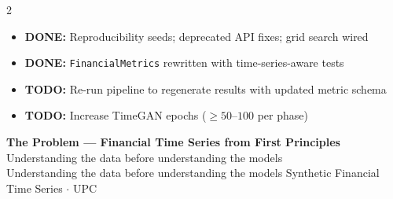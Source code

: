 \documentclass[10pt]{article}
\newcommand{\greenbox}[2]{\begin{tcolorbox}[mybox={FGreen}{GBg},title={#1}]#2\end{tcolorbox}}
\newcommand{\pagehead}[2]{%
  \begin{tcolorbox}[enhanced,arc=0pt,outer arc=0pt,boxrule=0pt,
    colback=Navy,colframe=Navy,
    top=5pt,bottom=5pt,left=8pt,right=8pt,
    before skip=0pt,after skip=10pt]
  {\color{white}\large\bfseries #1}%
  \ifx\relax#2\relax\else\\[1pt]{\color{blue!30!white}\small #2}\fi
  \hfill{\color{blue!20!white}\footnotesize Synthetic Financial Time Series $\cdot$ UPC}
  \end{tcolorbox}}
\begin{document}
\begin{multicols}{2}
\greenbox{Pipeline Status}{%
\begin{itemize}
  \item \textbf{DONE:} Reproducibility seeds; deprecated API fixes; grid search wired
  \item \textbf{DONE:} \texttt{FinancialMetrics} rewritten with time-series-aware tests
  \item \textbf{TODO:} Re-run pipeline to regenerate results with updated metric schema
  \item \textbf{TODO:} Increase TimeGAN epochs ($\geq 50$--$100$ per phase)
\end{itemize}}

\end{multicols}

\clearpage

\pagehead{The Problem --- Financial Time Series from First Principles}
         {Understanding the data before understanding the models}
\end{document}
